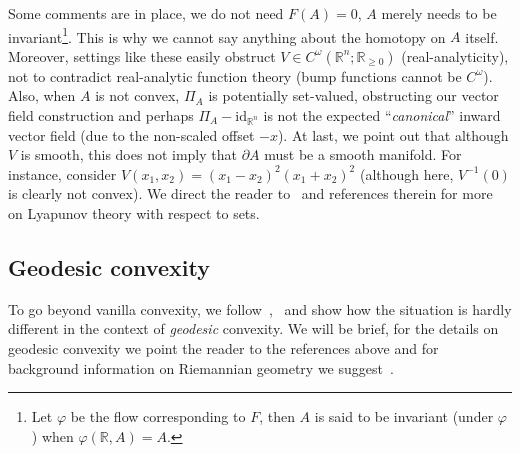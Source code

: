 \documentclass[letterpaper, 10 pt, conference]{ieeeconf}  %
\theoremstyle{mystyle}
\begin{document}
Some comments are in place, we do not need $F(A)=0$, $A$ merely needs to be invariant\footnote{Let $\varphi$ be the flow corresponding to $F$, then $A$ is said to be invariant (under $\varphi$) when $\varphi(\mathbb{R},A)=A$.}. This is why we cannot say anything about the homotopy on $A$ itself. Moreover, settings like these easily obstruct $V\in C^{\omega}(\mathbb{R}^n;\mathbb{R}_{\geq 0})$ (real-analyticity), not to contradict real-analytic function theory (bump functions cannot be $C^{\omega}$). Also, when $A$ is not convex, $\Pi_A$ is potentially set-valued, obstructing our vector field construction and perhaps $\Pi_A-\mathrm{id}_{\mathbb{R}^n}$ is not the expected ``\textit{canonical}'' inward vector field (due to the non-scaled offset $-x$). At last, we point out that although $V$ is smooth, this does not imply that $\partial A$ must be a smooth manifold. For instance, consider $V(x_1,x_2)=(x_1-x_2)^2(x_1+x_2)^2$ (although here, $V^{-1}(0)$ is clearly not convex). We direct the reader to~\cite{ref:fathi2019smoothing} and references therein for more on Lyapunov theory with respect to sets. 

\subsection{Geodesic convexity} 
To go beyond vanilla convexity, we follow~\cite[Ch.~3]{ref:udriste2013convex},~\cite[Ch.~11]{ref:boumal2020introduction} and show how the situation is hardly different in the context of \textit{geodesic} convexity. We will be brief, for the details on geodesic convexity we point the reader to the references above and for background information on Riemannian geometry we suggest~\cite{Lee3}. 
\end{document}
